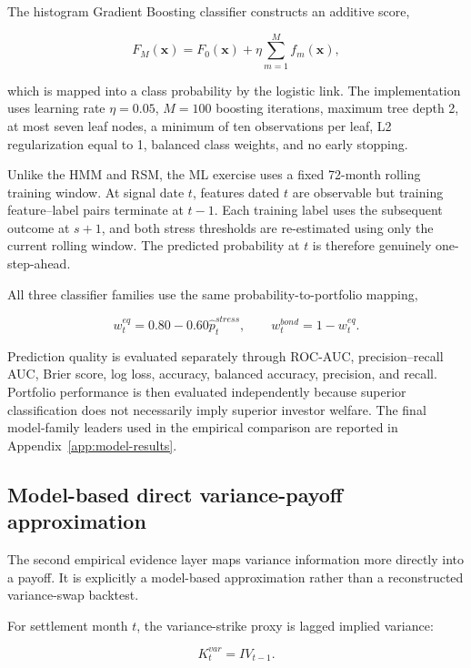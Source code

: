 The histogram Gradient Boosting classifier constructs an additive score,

\begin{equation}
F_M(\mathbf{x})
=
F_0(\mathbf{x})
+
\eta
\sum_{m=1}^{M}
f_m(\mathbf{x}),
\end{equation}

which is mapped into a class probability by the logistic link. The implementation uses learning
rate $\eta=0.05$, $M=100$ boosting iterations, maximum tree depth 2, at most seven leaf nodes,
a minimum of ten observations per leaf, L2 regularization equal to 1, balanced class weights,
and no early stopping.

Unlike the HMM and RSM, the ML exercise uses a fixed 72-month rolling training window.
At signal date $t$, features dated $t$ are observable but training feature--label pairs terminate at
$t-1$. Each training label uses the subsequent outcome at $s+1$, and both stress thresholds are
re-estimated using only the current rolling window. The predicted probability at $t$ is therefore
genuinely one-step-ahead.

All three classifier families use the same probability-to-portfolio mapping,

\begin{equation}
w_t^{eq}
=
0.80
-
0.60
\widehat{p}_t^{stress},
\qquad
w_t^{bond}
=
1-w_t^{eq}.
\end{equation}

Prediction quality is evaluated separately through ROC-AUC, precision--recall AUC, Brier
score, log loss, accuracy, balanced accuracy, precision, and recall. Portfolio performance is then
evaluated independently because superior classification does not necessarily imply superior
investor welfare. The final model-family leaders used in the empirical comparison are reported in
Appendix~\ref{app:model-results}.

\subsection{Model-based direct variance-payoff approximation}

The second empirical evidence layer maps variance information more directly into a payoff. It is explicitly a model-based approximation rather than a reconstructed variance-swap backtest.

For settlement month $t$, the variance-strike proxy is lagged implied variance:

\begin{equation}
K_t^{var}
=
IV_{t-1}.
\end{equation}

